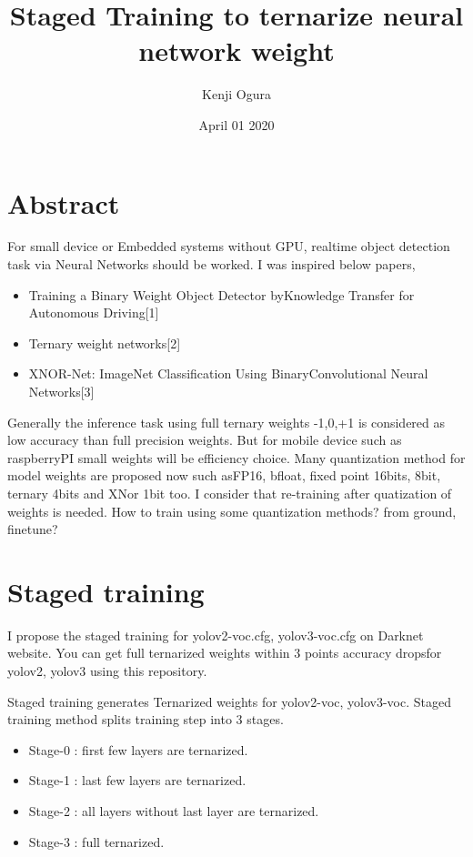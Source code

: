 \documentclass[twocolumn]{article}
\begin{document}
\title{Staged Training to ternarize neural network weight}
\author{Kenji Ogura}
\date{April 01 2020}
\maketitle

\section{Abstract}

For small device or Embedded systems without GPU, realtime object detection task via Neural Networks should be worked.
I was inspired below papers,
\begin{itemize}
\item
 Training a Binary Weight Object Detector byKnowledge Transfer for Autonomous Driving[1]
\item
 Ternary weight networks[2]
\item
 XNOR-Net: ImageNet Classification Using BinaryConvolutional Neural Networks[3]
\end{itemize}

Generally the inference task using full ternary weights -1,0,+1 is considered as low accuracy than full precision weights.
But for mobile device such as raspberryPI small weights will be efficiency choice.
Many quantization method for model weights are proposed now such asFP16, bfloat, fixed point 16bits, 8bit, ternary 4bits and XNor 1bit too.
I consider that re-training after quatization of weights is needed.
How to train using some quantization methods? from ground, finetune?

\section{Staged training}
I propose the staged training for yolov2-voc.cfg, yolov3-voc.cfg on Darknet website.
You can get full ternarized weights within 3 points accuracy dropsfor yolov2, yolov3 using this repository.

Staged training generates Ternarized weights for yolov2-voc, yolov3-voc.
Staged training method splits training step into 3 stages.

\begin{itemize}
\item Stage-0 : first few layers are ternarized.
\item Stage-1 : last few layers are ternarized.
\item Stage-2 : all layers without last layer are ternarized.
\item Stage-3 : full ternarized.
\end{itemize}
\end{document}
